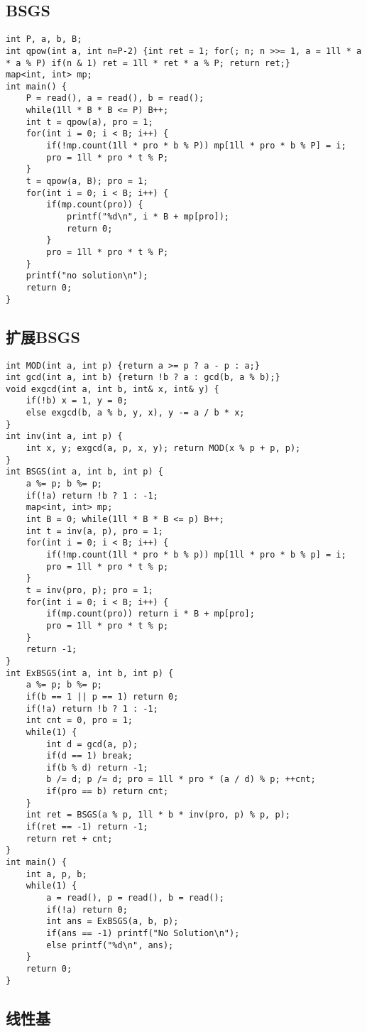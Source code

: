 \documentclass{article}
\begin{document}
   \subsection{BSGS}
\begin{lstlisting}
int P, a, b, B;
int qpow(int a, int n=P-2) {int ret = 1; for(; n; n >>= 1, a = 1ll * a * a % P) if(n & 1) ret = 1ll * ret * a % P; return ret;}
map<int, int> mp;
int main() {
	P = read(), a = read(), b = read();
	while(1ll * B * B <= P) B++;
	int t = qpow(a), pro = 1;
	for(int i = 0; i < B; i++) {
		if(!mp.count(1ll * pro * b % P)) mp[1ll * pro * b % P] = i;
		pro = 1ll * pro * t % P;
	}
	t = qpow(a, B); pro = 1;
	for(int i = 0; i < B; i++) {
		if(mp.count(pro)) {
			printf("%d\n", i * B + mp[pro]);
			return 0;
		}
		pro = 1ll * pro * t % P;
	}
	printf("no solution\n");
	return 0;
}
\end{lstlisting}

   \subsection{扩展BSGS}
\begin{lstlisting}
int MOD(int a, int p) {return a >= p ? a - p : a;}
int gcd(int a, int b) {return !b ? a : gcd(b, a % b);}
void exgcd(int a, int b, int& x, int& y) {
	if(!b) x = 1, y = 0;
	else exgcd(b, a % b, y, x), y -= a / b * x;
}
int inv(int a, int p) {
	int x, y; exgcd(a, p, x, y); return MOD(x % p + p, p);
}
int BSGS(int a, int b, int p) {
	a %= p; b %= p;
	if(!a) return !b ? 1 : -1;
	map<int, int> mp;
	int B = 0; while(1ll * B * B <= p) B++;
	int t = inv(a, p), pro = 1;
	for(int i = 0; i < B; i++) {
		if(!mp.count(1ll * pro * b % p)) mp[1ll * pro * b % p] = i;
		pro = 1ll * pro * t % p;
	}
	t = inv(pro, p); pro = 1;
	for(int i = 0; i < B; i++) {
		if(mp.count(pro)) return i * B + mp[pro];
		pro = 1ll * pro * t % p;
	}
	return -1;
}
int ExBSGS(int a, int b, int p) {
	a %= p; b %= p;
	if(b == 1 || p == 1) return 0;
	if(!a) return !b ? 1 : -1;
	int cnt = 0, pro = 1;
	while(1) {
		int d = gcd(a, p);
		if(d == 1) break;
		if(b % d) return -1;
		b /= d; p /= d; pro = 1ll * pro * (a / d) % p; ++cnt;
		if(pro == b) return cnt;
	}
	int ret = BSGS(a % p, 1ll * b * inv(pro, p) % p, p);
	if(ret == -1) return -1;
	return ret + cnt;
}
int main() {
	int a, p, b;
	while(1) {
		a = read(), p = read(), b = read();
		if(!a) return 0;
		int ans = ExBSGS(a, b, p);
		if(ans == -1) printf("No Solution\n");
		else printf("%d\n", ans);
	}
	return 0;
}
\end{lstlisting}
    \subsection{线性基}
\end{document}
